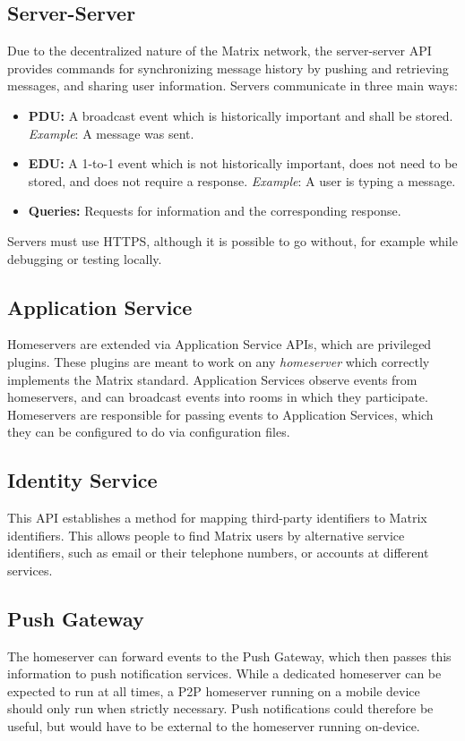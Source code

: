 \subsection{Server-Server}
Due to the decentralized nature of the Matrix network, the server-server \ac{API} provides commands for synchronizing message history by pushing and retrieving messages, and sharing user information.
Servers communicate in three main ways:
\begin{itemize}
      \item{
            \textbf{\ac{PDU}:}
            A broadcast event which is historically important and shall be stored.
            \textit{Example}: A message was sent.
            }
      \item{
            \textbf{\ac{EDU}:}
            A 1-to-1 event which is not historically important, does not need to be stored, and does not require a response.
            \textit{Example}: A user is typing a message.
            }
      \item{
            \textbf{Queries:}
            Requests for information and the corresponding response.
            }
\end{itemize}
Servers must use \ac{HTTPS}, although it is possible to go without, for example while debugging or testing locally.

\subsection{Application Service}
Homeservers are extended via Application Service \ac{API}s, which are privileged plugins.
These plugins are meant to work on any \textit{homeserver} which correctly implements the Matrix standard.
Application Services observe events from homeservers, and can broadcast events into rooms in which they participate.
Homeservers are responsible for passing events to Application Services, which they can be configured to do via configuration files.

\subsection{Identity Service}
This \ac{API} establishes a method for mapping third-party identifiers to Matrix identifiers.
This allows people to find Matrix users by alternative service identifiers, such as email or their telephone numbers, or accounts at different services.

\subsection{Push Gateway}
The homeserver can forward events to the Push Gateway, which then passes this information to push notification services.
While a dedicated homeserver can be expected to run at all times, a \ac{P2P} homeserver running on a mobile device should only run when strictly necessary.
Push notifications could therefore be useful, but would have to be external to the homeserver running on-device.



